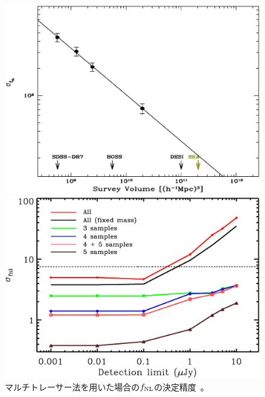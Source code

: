 \begin{figure}[t]
 \begin{minipage}{0.53\hsize}
 \begin{center}
   \includegraphics[width=1.0\linewidth]{cosmology/fnl.eps} 
   \caption{ジーナス統計を用いた$f_{\rm NL}$の決定精度。%
}
\label{fig:fnl}
 \end{center}
 \end{minipage}
 \begin{minipage}{0.51\hsize}
 \begin{center}
   \vspace{5pt}
   \includegraphics[width=1.0\linewidth]{cosmology/fig5.eps} 
  \caption{マルチトレーサー法を用いた場合の$f_{\rm NL}$の決定精度~\citep{Ferramacho:2014pua}。
}
\label{fig:Ferramacho}
 \end{center}
 \end{minipage}
\end{figure}


